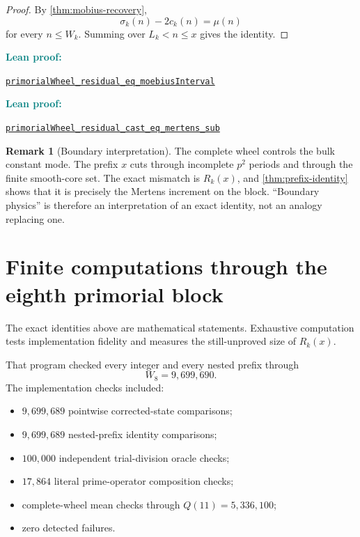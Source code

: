 \documentclass[11pt]{article}
\theoremstyle{definition}
\newtheorem{remark}[theorem]{Remark}
\newcommand{\leanxref}[3]{%
  \par\smallskip
  {\small\noindent\textcolor{teal}{\textbf{#1:}}\par
  \noindent\href{#3}{\nolinkurl{#2}}\par}
  \smallskip
}
\begin{document}
\begin{proof}
By \cref{thm:mobius-recovery},
\[
\sigma_k(n)-2c_k(n)=\mu(n)
\]
for every $n\le W_k$.  Summing over $L_k<n\le x$ gives the identity.
\end{proof}
\leanxref{Lean proof}{primorialWheel_residual_eq_moebiusInterval}{https://github.com/OVVO-Financial/prime-wheel-mobius/blob/main/formalization/RHLean/Arithmetic/PrimorialWheelPrefixIdentity.lean}
\leanxref{Lean proof}{primorialWheel_residual_cast_eq_mertens_sub}{https://github.com/OVVO-Financial/prime-wheel-mobius/blob/main/formalization/RHLean/Arithmetic/PrimorialWheelPrefixIdentity.lean}

\begin{remark}[Boundary interpretation]
The complete wheel controls the bulk constant mode.  The prefix $x$ cuts through incomplete $p^2$ periods and through the finite smooth-core set.  The exact mismatch is $R_k(x)$, and \cref{thm:prefix-identity} shows that it is precisely the Mertens increment on the block.  ``Boundary physics'' is therefore an interpretation of an exact identity, not an analogy replacing one.
\end{remark}

\section{Finite computations through the eighth primorial block}

The exact identities above are mathematical statements.  Exhaustive computation tests implementation fidelity and measures the still-unproved size of $R_k(x)$.

That program checked every integer and every nested prefix through
\[
W_8=9{,}699{,}690.
\]
The implementation checks included:
\begin{itemize}
\item $9{,}699{,}689$ pointwise corrected-state comparisons;
\item $9{,}699{,}689$ nested-prefix identity comparisons;
\item $100{,}000$ independent trial-division oracle checks;
\item $17{,}864$ literal prime-operator composition checks;
\item complete-wheel mean checks through $Q(11)=5{,}336{,}100$;
\item zero detected failures.
\end{itemize}
\end{document}
